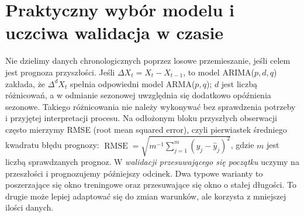 \section{Praktyczny wybór modelu i uczciwa walidacja w czasie}
Nie dzielimy danych chronologicznych poprzez losowe
przemieszanie, jeśli celem jest prognoza przyszłości.
Jeśli $\Delta X_t=X_t-X_{t-1}$, to model
ARIMA($p,d,q$) zakłada, że $\Delta^d X_t$ spełnia
odpowiedni model ARMA($p,q$); $d$ jest liczbą
różnicowań, a w odmianie sezonowej uwzględnia się
dodatkowo opóźnienia sezonowe. Takiego różnicowania
nie należy wykonywać bez sprawdzenia potrzeby i
przyjętej interpretacji procesu.
Na odłożonym bloku przyszłych obserwacji często mierzymy
RMSE (root mean squared error), czyli pierwiastek
średniego kwadratu błędu prognozy:
$\operatorname{RMSE}=\sqrt{m^{-1}\sum_{j=1}^m(y_j-\widehat y_j)^2}$,
gdzie $m$ jest liczbą sprawdzanych prognoz.
W \emph{walidacji przesuwającego się początku} uczymy
na przeszłości i prognozujemy późniejszy odcinek.
Dwa typowe warianty to poszerzające się okno treningowe
oraz przesuwające się okno o stałej długości.
To drugie może lepiej adaptować się do zmian
warunków, ale korzysta z mniejszej ilości danych.

\begin{center}
\end{center}

